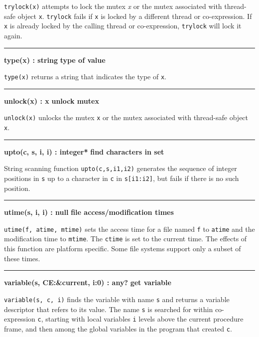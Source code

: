 \noindent
{}\texttt{trylock(x)} attempts to lock the mutex {\textit x} or the
mutex associated with thread-safe object \texttt{x}. \texttt{trylock} fails
if \texttt{x} is locked by a different thread or co-expression. If \texttt{x}
is already locked by the calling thread or co-expression, \texttt{trylock}
will lock it again.

\bigskip\hrule\vspace{0.1cm}
\noindent
{\bf type(x) : string } \hfill {\bf type of value}

\noindent
{}\texttt{type(x)} returns a string that indicates the type
of \texttt{x}.

\bigskip\hrule\vspace{0.1cm}
\noindent
{\bf unlock(x) : x } \hfill {\bf unlock mutex}

\noindent
{}\texttt{unlock(x)} unlocks the mutex \texttt{x} or the mutex
associated with thread-safe object \texttt{x}.

\bigskip\hrule\vspace{0.1cm}
\noindent
{\bf upto(c, s, i, i) : integer* } \hfill {\bf find characters in set}

\noindent
String scanning function \texttt{upto(c,s,i1,i2)}
generates the sequence of integer positions in \texttt{s} up to a
character in \texttt{c} in \texttt{s[i1:i2]}, but fails if there is no
such position.

\bigskip\hrule\vspace{0.1cm}
\noindent
{\bf utime(s, i, i) : null } \hfill {\bf file access/modification times}

\noindent
\texttt{utime(f, atime, mtime)} sets the access
time for a file named \texttt{f} to \texttt{atime} and the modification
time to \texttt{mtime}. The \texttt{ctime} is set to the current time.
The effects of this function are platform specific. Some file systems
support only a subset of these times.

\bigskip\hrule\vspace{0.1cm}
\noindent
{\bf variable(s, CE:\&current, i:0) : any? } \hfill {\bf get variable}

\noindent
{}\texttt{variable(s, c, i)} finds the variable
with name \texttt{s} and returns a variable descriptor that refers to
its value. The name \texttt{s} is searched for within co-expression
\texttt{c}, starting with local variables \texttt{i} levels above the
current procedure frame, and then among the global variables in the
program that created \texttt{c}.

